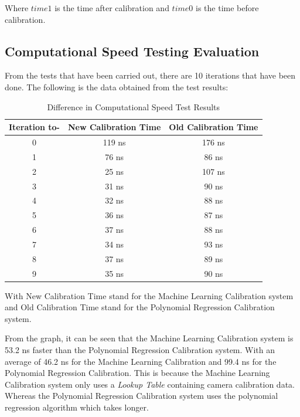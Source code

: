 Where $time1$ is the time after calibration and $time0$ is the time before calibration.

\subsection{Computational Speed Testing Evaluation}
\label{sec:3}

From the tests that have been carried out, there are 10 iterations that have been done. The following is the data obtained from the test results:

\begin{table}[htpb]
  \caption{Difference in Computational Speed Test Results}
\begin{center}

\begin{tabular}{|c|c|c|}
  \hline
  \rowcolor[HTML]{C0C0C0}
  \textbf{Iteration to-} & \textbf{New Calibration Time} & \textbf{Old Calibration Time} \\
  \hline
  0            & 119 ns                & 176 ns            \\
  1           & 76 ns                & 86 ns            \\
  2           & 25 ns                & 107 ns            \\
  3           & 31 ns                & 90 ns           \\
  4           & 32 ns                & 88 ns           \\
  5           & 36 ns                & 87 ns           \\
  6           & 37 ns                & 88 ns           \\
  7           & 34 ns                & 93 ns           \\
  8           & 37 ns                & 89 ns           \\
  9           & 35 ns                & 90 ns           \\
  \hline
\end{tabular}
\end{center}
\end{table}

With New Calibration Time stand for the Machine Learning Calibration system and Old Calibration Time stand for the Polynomial Regression Calibration system.

From the graph, it can be seen that the Machine Learning Calibration system is 53.2 ns faster than the Polynomial Regression Calibration system. With an average of 46.2 ns for the Machine Learning Calibration and 99.4 ns for the Polynomial Regression Calibration. This is because the Machine Learning Calibration system only uses a \emph{Lookup Table} containing camera calibration data. Whereas the Polynomial Regression Calibration system uses the polynomial regression algorithm which takes longer.


